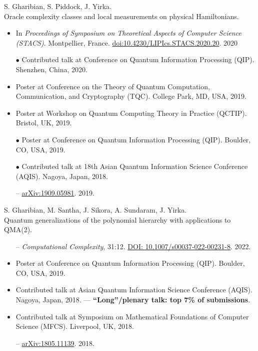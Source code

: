 \documentclass[11pt,letterpaper,serif]{moderncv}
\newcommand{\pubItemSep}{0em}
\begin{document}
S. Gharibian, S. Piddock, J. Yirka.
\\Oracle complexity classes and local measurements on physical Hamiltonians.
\begin{adjustwidth}{.1in}{}
	\begin{itemize}[itemsep=\pubItemSep]
		\item In \textit{Proceedings of Symposium on Theoretical Aspects of Computer Science (STACS)}. Montpellier, France. \href{https://doi.org/10.4230/LIPIcs.STACS.2020.20}{doi:10.4230/LIPIcs.STACS.2020.20}. 2020
		\item[$\bullet$] Contributed talk at Conference on Quantum Information Processing (QIP). Shenzhen, China, 2020.
		\item Poster at Conference on the Theory of Quantum Computation, Communication, and Cryptography (TQC). College Park, MD, USA, 2019.
		\item Poster at Workshop on Quantum Computing Theory in Practice (QCTIP). Bristol, UK, 2019.
		\item[$\bullet$] Poster at Conference on Quantum Information Processing (QIP). Boulder, CO, USA, 2019.
		\item[$\bullet$] Contributed talk at 18th Asian Quantum Information Science Conference (AQIS). Nagoya, Japan, 2018.
		\item[--]  \href{https://arxiv.org/abs/1909.05981}{arXiv:1909.05981}. 2019.
	\end{itemize}
\end{adjustwidth}
\vspace{\parsep}

S. Gharibian, M. Santha, J. Sikora, A. Sundaram, J. Yirka.
\\Quantum generalizations of the polynomial hierarchy with applications to QMA(2).
\begin{adjustwidth}{.1in}{}
	\begin{itemize}[itemsep=\pubItemSep]
		\item[--] \textit{Computational Complexity}, 31:12. \href{https://doi.org/10.1007/s00037-022-00231-8}{DOI: 10.1007/s00037-022-00231-8}. 2022.
		\item Poster at Conference on Quantum Information Processing (QIP). Boulder, CO, USA, 2019.
		\item Contributed talk at Asian Quantum Information Science Conference (AQIS). Nagoya, Japan, 2018. --- \textbf{``Long''/plenary talk: top 7\% of submissions}.
		\item Contributed talk at Symposium on Mathematical Foundations of Computer Science (MFCS). Liverpool, UK, 2018.
		\item[--] \href{https://arxiv.org/abs/1805.11139}{arXiv:1805.11139}. 2018.
	\end{itemize}
\end{adjustwidth}
\vspace{\parsep}
\end{document}
